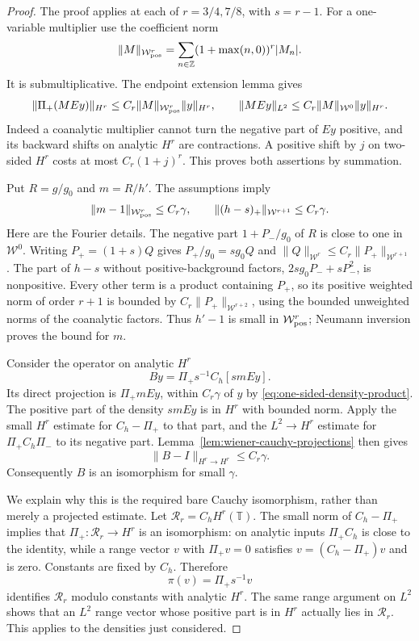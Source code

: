 \documentclass[11pt]{article}
\newcommand{\T}{\mathbb T}
\begin{document}
\begin{proof}
The proof applies at each of $r=3/4,7/8$, with $s=r-1$.
For a one-variable multiplier use the coefficient norm
\[
 \|M\|_{\mathcal W_{\rm pos}^r}
   =\sum_{n\in\mathbb Z}(1+\max(n,0))^r|M_n|.
\]
It is submultiplicative. The endpoint extension lemma gives
\begin{equation}\label{eq:one-sided-density-product}
 \|\Pi_+(M Ey)\|_{H^r}
       \le C_r\|M\|_{\mathcal W_{\rm pos}^r}\|y\|_{H^r},
 \qquad
 \|M Ey\|_{L^2}\le C_r\|M\|_{\mathcal W^0}\|y\|_{H^r}.
\end{equation}
Indeed a coanalytic multiplier cannot turn the negative part of
$Ey$ positive, and its backward shifts on analytic $H^r$ are
contractions. A positive shift by $j$ on two-sided $H^r$ costs
at most $C_r(1+j)^r$. This proves both assertions by summation.

Put $R=g/g_0$ and $m=R/h'$. The assumptions imply
\[
 \|m-1\|_{\mathcal W_{\rm pos}^r}\le C_r\gamma,\qquad
 \|(h-s)_+\|_{\mathcal W^{r+1}}\le C_r\gamma .
\]
Here are the Fourier details. The negative part
$1+P_-/g_0$ of $R$ is close to one in $\mathcal W^0$.
Writing $P_+=(1+s)Q$ gives $P_+/g_0=sg_0Q$ and
$\|Q\|_{\mathcal W^r}\le C_r\|P_+\|_{\mathcal W^{r+1}}$.
The part of $h-s$ without positive-background factors,
$2sg_0P_-+sP_-^2$, is nonpositive. Every other term is a
product containing $P_+$, so its positive weighted norm of
order $r+1$ is bounded by $C_r\|P_+\|_{\mathcal W^{r+2}}$,
using the bounded unweighted norms of the coanalytic factors.
Thus $h'-1$ is small in $\mathcal W_{\rm pos}^r$; Neumann
inversion proves the bound for $m$.

Consider the operator on analytic $H^r$
\[
 By=\Pi_+s^{-1}C_h[s m Ey].
\]
Its direct projection is $\Pi_+m Ey$, within $C_r\gamma$ of $y$
by \eqref{eq:one-sided-density-product}. The positive part of
the density $s m Ey$ is in $H^r$ with bounded norm. Apply
the small $H^r$ estimate for $C_h-\Pi_+$ to that part, and the
$L^2\to H^r$ estimate for $\Pi_+C_h\Pi_-$ to its negative part.
Lemma~\ref{lem:wiener-cauchy-projections} then gives
\[
 \|B-I\|_{H^r\to H^r}\le C_r\gamma .
\]
Consequently $B$ is an isomorphism for small $\gamma$.

We explain why this is the required bare Cauchy isomorphism,
rather than merely a projected estimate. Let
$\mathcal R_r=C_hH^r(\T)$. The small norm of $C_h-\Pi_+$ implies
that $\Pi_+:\mathcal R_r\to H^r$ is an isomorphism: on analytic
inputs $\Pi_+C_h$ is close to the identity, while a range vector
$v$ with $\Pi_+v=0$ satisfies $v=(C_h-\Pi_+)v$ and is zero.
Constants are fixed by $C_h$. Therefore
\[
 \pi(v)=\Pi_+s^{-1}v
\]
identifies $\mathcal R_r$ modulo constants with analytic $H^r$.
The same range argument on $L^2$ shows that an $L^2$ range
vector whose positive part is in $H^r$ actually lies in
$\mathcal R_r$. This applies to the densities just considered.


\end{proof}
\end{document}
